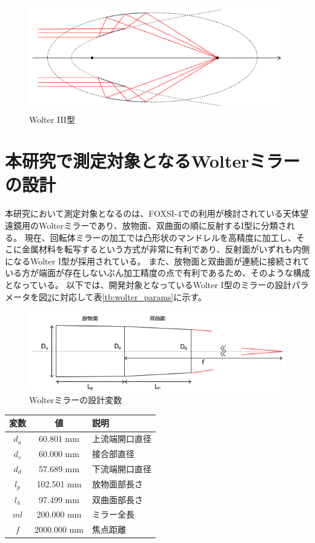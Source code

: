 \documentclass[dvipdfmx,autodetect-engine]{jreport}
\begin{document}
\begin{figure}[h!]
\centering
\includegraphics[scale=0.4]{images/intro/wolter_type_3.png}
\caption{Wolter III型}
\label{fig:wolter_type_3}
\end{figure}


\section{本研究で測定対象となるWolterミラーの設計}
本研究において測定対象となるのは、FOXSI-4での利用が検討されている天体望遠鏡用のWolterミラーであり、放物面、双曲面の順に反射するI型に分類される。
現在、回転体ミラーの加工では凸形状のマンドレルを高精度に加工し、そこに金属材料を転写するという方式が非常に有利であり、反射面がいずれも内側になるWolter I型が採用されている。
また、放物面と双曲面が連続に接続されている方が端面が存在しないぶん加工精度の点で有利であるため、そのような構成となっている。
以下では、開発対象となっているWolter I型のミラーの設計パラメータを図\ref{fig:wolter_params}に対応して表\ref{tb:wolter_params}に示す。

\begin{figure}[h!]
\centering
\includegraphics[scale=0.55]{images/mirror_experiment/mirror_params.png}
\caption{Wolterミラーの設計変数}
\label{fig:wolter_params}
\end{figure}

\begin{center}
  \begin{tabular}{|c|c|l|} \hline
    変数 & 値 & 説明 \\ \hline
    $d_u$ & 60.801 mm & 上流端開口直径 \\
    $d_s$ & 60.000 mm & 接合部直径 \\
    $d_d$ & 57.689 mm & 下流端開口直径 \\
    $l_p$ & 102.501 mm & 放物面部長さ \\
    $l_h$ & 97.499 mm & 双曲面部長さ \\
    $ml$ & 200.000 mm & ミラー全長 \\
    $f$ & 2000.000 mm & 焦点距離 \\ \hline
  \end{tabular}
  \label{tb:wolter_params}
  \caption{Wolterミラー各設計変数の値}
\end{center}
\end{document}
